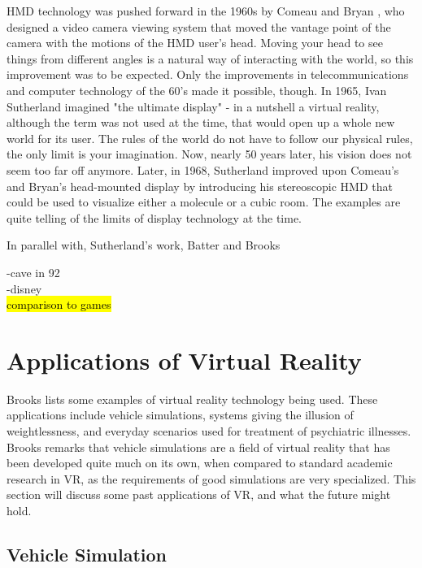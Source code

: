 \documentclass[12pt,a4paper,oneside,pdftex]{report}
\begin{document}
HMD technology was pushed forward in the 1960s by Comeau and Bryan \cite{comeau1961headsight}, who designed a video camera viewing system that moved the vantage point of the camera with the motions of the HMD user's head. Moving your head to see things from different angles is a natural way of interacting with the world, so this improvement was to be expected. Only the improvements in telecommunications and computer technology of the 60's made it possible, though. In 1965, Ivan Sutherland imagined "the ultimate display" \cite{sutherland1965ultimate} - in a nutshell a virtual reality, although the term was not used at the time, that would open up a whole new world for its user. The rules of the world do not have to follow our physical rules, the only limit is your imagination. Now, nearly 50 years later, his vision does not seem too far off anymore. Later, in 1968, Sutherland \cite{SutherlandHMD} improved upon Comeau's and Bryan's head-mounted display by introducing his stereoscopic HMD that could be used to visualize either a molecule or a cubic room. The examples are quite telling of the limits of display technology at the time.

In parallel with, Sutherland's work, Batter and Brooks 


-cave in 92 \\
-disney  \\
 \hl{comparison to games}


\section{Applications of Virtual Reality}
\label{section:applicationsofvr}

Brooks \cite{brooks1999whatsreal} lists some examples of virtual reality technology being used. These applications include vehicle simulations, systems giving the illusion of weightlessness, and everyday scenarios used for treatment of psychiatric illnesses. Brooks remarks that vehicle simulations are a field of virtual reality that has been developed quite much on its own, when compared to standard academic research in VR, as the requirements of good simulations are very specialized. This section will discuss some past applications of VR, and what the future might hold.

\subsection{Vehicle Simulation}
\label{subsection:applications:vehiclesimulations}
\end{document}
